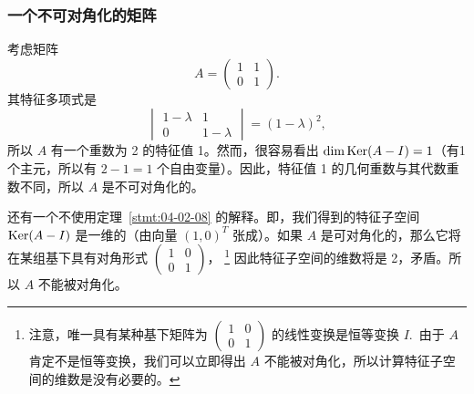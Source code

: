 \subsubsection{一个不可对角化的矩阵}\label{sec:04-02-07-03}

考虑矩阵
$$A = \begin{pmatrix} 1 & 1 \\ 0 & 1 \end{pmatrix}.$$
其特征多项式是
$$\begin{vmatrix} 1-\lambda & 1 \\ 0 & 1-\lambda \end{vmatrix} = (1-\lambda)^2,$$
所以 $A$ 有一个重数为 2 的特征值 1。然而，很容易看出 $\dim \operatorname{Ker}(A - I) = 1$（有1个主元，所以有 $2-1=1$ 个自由变量）。因此，特征值 1 的几何重数与其代数重数不同，所以 $A$ 是不可对角化的。

还有一个不使用定理~\ref{stmt:04-02-08} 的解释。即，我们得到的特征子空间 $\operatorname{Ker}(A - I)$ 是一维的（由向量 $(1, 0)^T$ 张成）。如果 $A$ 是可对角化的，那么它将在某组基下具有对角形式 $\begin{pmatrix} 1 & 0 \\ 0 & 1 \end{pmatrix}$，
\footnote{
注意，唯一具有某种基下矩阵为 $\begin{pmatrix} 1 & 0 \\ 0 & 1 \end{pmatrix}$ 的线性变换是恒等变换 $I$.~由于 $A$ 肯定不是恒等变换，我们可以立即得出 $A$ 不能被对角化，所以计算特征子空间的维数是没有必要的。
}
因此特征子空间的维数将是 2，矛盾。所以 $A$ 不能被对角化。

